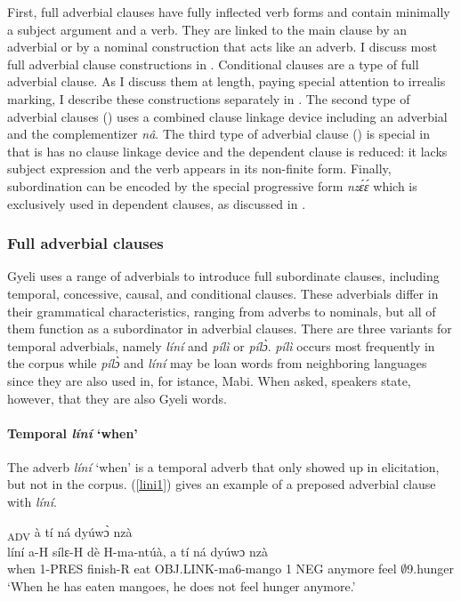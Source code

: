 First, full adverbial clauses have fully inflected verb forms and contain minimally a subject argument and a verb. They are linked to the main clause by an adverbial or by a nominal construction that acts like an adverb. I discuss most full adverbial clause constructions in . Conditional clauses are a type of full adverbial clause. As I discuss them at length, paying special attention to irrealis marking, I describe these constructions separately in . The second type of adverbial clauses () uses a combined clause linkage device including an adverbial and the complementizer {\itshape nâ}. The third type of adverbial clause () is special in that is has no clause linkage device and the dependent clause is reduced: it lacks subject expression and the verb appears in its non-finite form. Finally, subordination can be encoded by the special progressive form {\itshape nzɛ́ɛ́} which is exclusively used in dependent clauses, as discussed in .


\subsubsection{Full adverbial clauses}
\label{sec:ADVfull}

Gyeli uses a range of adverbials to introduce full subordinate clauses, including temporal, concessive, causal, and conditional clauses. These adverbials differ in their grammatical characteristics, ranging from adverbs to nominals, but all of them function as a subordinator in adverbial clauses.
There are three variants for temporal adverbials, namely {\itshape líní} and {\itshape pílì} or {\itshape pílɔ̀}. {\itshape pílì} occurs most frequently in the corpus while {\itshape pílɔ̀} and {\itshape líní} may be loan words from neighboring languages since they are also used in, for istance, Mabi. When asked, speakers state, however, that they are also Gyeli words.


\paragraph{Temporal {\itshape líní} `when'}
The adverb {\itshape líní} `when' is a temporal adverb that only showed up in elicitation, but not in the corpus. (\ref{lini1}) gives an example of a preposed adverbial clause with {\itshape líní}.


\begin{exe}
\ex\label{lini1}
  \textsubscript{ADV} à tí ná dyúwɔ̀ nzà \\
           líní a-H sílɛ-H dè H-ma-ntúà, a tí ná dyúwɔ nzà  \\
              when 1-PRES finish-R eat OBJ.LINK-ma6-mango 1 NEG anymore feel $\emptyset$9.hunger\\
    \trans `When he has eaten mangoes, he does not feel hunger anymore.'
\end{exe}

